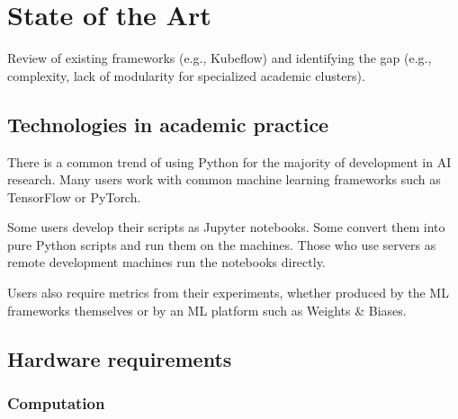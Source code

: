 \section{State of the Art}

Review of existing frameworks (e.g., Kubeflow) and identifying the gap (e.g., complexity, lack of modularity for specialized academic clusters).


\subsection{Technologies in academic practice}

There is a common trend of using Python for the majority of development in AI research. Many users work with common machine learning frameworks such as TensorFlow or PyTorch.


Some users develop their scripts as Jupyter notebooks. Some convert them into pure Python scripts and run them on the machines. Those who use servers as remote development machines run the notebooks directly.

Users also require metrics from their experiments, whether produced by the ML frameworks themselves or by an ML platform such as Weights \& Biases.



\subsection{Hardware requirements}

\subsubsection{Computation}

